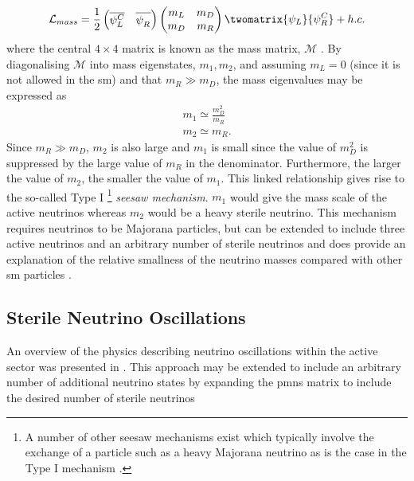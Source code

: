 \begin{equation}
    \mathcal{L}_{mass} = \frac{1}{2} 
    \begin{pmatrix}
    \overline{\psi_L^C} & \overline{\psi_R^{\phantom{C}}}
    \end{pmatrix}
    \begin{pmatrix}
    m_L & m_D \\
    m_D & m_R
    \end{pmatrix}
    \twomatrix {\psi_L} {\psi_R^C} + h.c.
\end{equation}
where the central $4 \times 4$ matrix is known as the mass matrix, $\mathcal{M}$ \cite{White_Paper}. By diagonalising $\mathcal{M}$ into mass eigenstates, $m_1, m_2$, and assuming $m_L = 0$ (since it is not allowed in the \gls{sm}) and that $m_R \gg m_D$, the mass eigenvalues may be expressed as
\begin{equation}
\begin{split}
    m_1 \simeq \frac{m_D^2}{m_R} \\
    m_2 \simeq m_R.
\end{split}
\end{equation}
Since $m_R \gg m_D$, $m_2$ is also large and $m_1$ is small since the value of $m_D^2$ is suppressed by the large value of $m_R$ in the denominator. Furthermore, the larger the value of $m_2$, the smaller the value of $m_1$. This linked relationship gives rise to the so-called Type I \footnote{A number of other seesaw mechanisms exist which typically involve the exchange of a particle such as a heavy Majorana neutrino as is the case in the Type I mechanism \cite{White_Paper}.} \textit{seesaw mechanism}. $m_1$ would give the mass scale of the active neutrinos whereas $m_2$ would be a heavy sterile neutrino. This mechanism requires neutrinos to be Majorana particles, but can be extended to include three active neutrinos and an arbitrary number of sterile neutrinos and does provide an explanation of the relative smallness of the neutrino masses compared with other \gls{sm} particles \cite{Fundamentals_of_Neutrino_Physics_and_Astrophysics}. 


\subsection{Sterile Neutrino Oscillations}\label{sec:sterile_neutrino_oscillations}
An overview of the physics describing neutrino oscillations within the active sector was presented in . This approach may be extended to include an arbitrary number of additional neutrino states by expanding the \gls{pmns} matrix to include the desired number of sterile neutrinos

